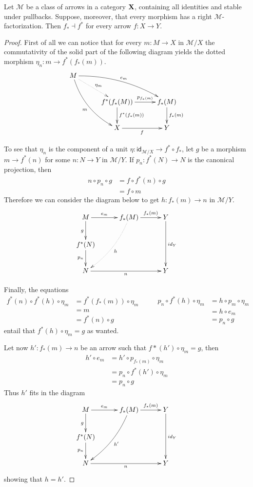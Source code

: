 \documentclass[a4paper,UKenglish,cleveref,pdftex,thm-restate,numberwithinsect]{lipics-v2021}
\newcommand{\id}[1]{\mathsf{id}_{#1}}
\def\X{\textbf {\textup{X}}}
\begin{document}
\begin{proposition}\label{prop:part}
	Let $\mathcal{M}$ be a class of arrows  in a category $\X$, containing  all identities and stable under pullbacks. Suppose, moreover, that every morphism has a right $\mathcal{M}$-factorization. Then $f_*\dashv f^*$ for every arrow $f\colon X\to Y$.  
\end{proposition}
\begin{proof}
	First of all we can notice that for every $m\colon M\to X$ in $\mathcal{M}/X$ the commutativity of the solid part of the following diagram yields the dotted morphism $\eta_n\colon m\to f^*(f_*(m))$.
	\[\xymatrix@C=30pt{M \ar@{.>}[dr]^{\eta_m} \ar@/^.4cm/[drr]^{e_m} \ar@/_.4cm/[ddr]_{m}\\ & f^*(f_*(M)) \ar[d]^{f^*(f_*(m))}\ar[r]^-{p_{f_*(m)}}& f_*(M) \ar[d]^{f_*(m)}\\ & X\ar[r]_f & Y}\]
	
	To see that $\eta_n$ is the component of a unit $\eta\colon \id{\mathcal{M}/X}\to f^*\circ f_*$, let $g$ be a morphism $m\to f^*(n)$ for some $n\colon N\to Y$ in $\mathcal{M}/Y$. If $p_n:f^*(N)\to N$ is the canonical projection, then 
	\begin{align*}
		n\circ p_n\circ g&=f\circ f^*(n)\circ g\\&=f\circ m
	\end{align*}
	Therefore we can consider the diagram below to get $h\colon f_*(m)\to n$ in $\mathcal{M}/Y$. 
	\[\xymatrix@C=30pt{M \ar[r]^-{e_m} \ar[d]_{g}& f_*(M) \ar[r]^-{f_*(m)}\ar@{.>}@/^.3cm/[ddl]^{h} & Y \ar[dd]^{\id{Y}}\\f^*(N) \ar[d]_{p_n}\\N \ar[rr]_{n}&& Y}\]
	
	Finally, the equations
	\[\begin{split}
		f^*(n)\circ f^*(h)\circ \eta_m&=f^*(f_*(m))\circ \eta_m\\&=m\\&=f^*(n)\circ g
	\end{split} \qquad \begin{split}
		p_n\circ f^*(h)\circ \eta_m&=h\circ p_m\circ \eta_m\\&=h\circ e_m\\&=p_n\circ g
	\end{split}\]
	entail that $f^*(h)\circ \eta_m=g$ as wanted.
	
	Let now $h'\colon f_*(m)\to n$ be an arrow such that $f*(h')\circ \eta_m=g$, then
	\begin{align*}
		h'\circ e_m&=h'\circ p_{f_*(m)}\circ \eta_m\\&=p_n\circ f^*(h')\circ \eta_m\\&=p_n\circ g
	\end{align*}
	Thus $h'$ fits in the diagram
	\[\xymatrix@C=30pt{M \ar[r]^-{e_m} \ar[d]_{g}& f_*(M) \ar[r]^-{f_*(m)}\ar@/^.3cm/[ddl]^{h'} & Y \ar[dd]^{\id{Y}}\\f^*(N) \ar[d]_{p_n}\\N \ar[rr]_{n}&& Y}\]
	showing that $h=h'$.	
\end{proof}
\end{document}
